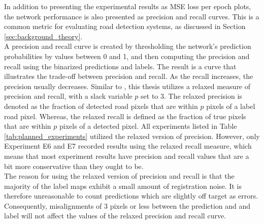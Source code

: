 In addition to presenting the experimental results as \ac{MSE} loss per epoch plots, the network performance is also presented as precision and recall curves. This is a common metric for evaluating road detection systems, as discussed in Section \ref{sec:background_theory}.\\

A precision and recall curve is created by thresholding the network's prediction probabilities by values between 0 and 1, and then computing the precision and recall using the binarized predictions and labels. The result is a curve that illustrates the trade-off between precision and recall. As the recall increases, the precision usually decreases. Similar to \citep{Mnih_aerial_images_noisy}, this thesis utilizes a relaxed measure of precision and recall, with a slack variable $p$ set to 3. The relaxed precision is denoted as the fraction of detected road pixels that are within $p$ pixels of a label road pixel. Whereas, the relaxed recall is defined as the fraction of true pixels that are within $p$ pixels of a detected pixel. All experiments listed in Table \ref{tab:planned_experiments} utilized the relaxed version of precision. However, only Experiment E6 and E7 recorded results using the relaxed recall measure, which means that most experiment results have precision and recall values that are a bit more conservative than they ought to be.\\

The reason for using the relaxed version of precision and recall is that the majority of the label maps exhibit a small amount of registration noise. It is therefore unreasonable to count predictions which are slightly off target as errors. Consequently, misalignments of 3 pixels or less between the prediction and and label will not affect the values of the relaxed precision and recall curve.\\



